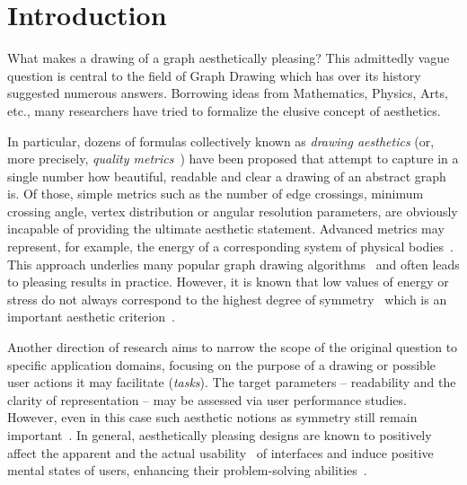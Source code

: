 
%

\section{Introduction}
\label{sec:intro}

What makes a drawing of a graph aesthetically pleasing? This admittedly vague question is central to the field of Graph
Drawing which has over its history suggested numerous answers.  Borrowing ideas from Mathematics, Physics, Arts, etc.,
many researchers have tried to formalize the elusive concept of aesthetics.

In particular, dozens of formulas collectively known as \emph{drawing aesthetics} (or, more precisely, \emph{quality
  metrics}~\cite{EadesH0K17}) have been proposed that attempt to capture in a single number how beautiful, readable and
clear a drawing of an abstract graph is.  Of those, simple metrics such as the number of edge crossings, minimum
crossing angle, vertex distribution or angular resolution parameters, are obviously incapable  of
providing the ultimate aesthetic statement.  Advanced metrics may represent, for example, the energy of a corresponding
system of physical bodies~\cite{eades84,FruchtermanR91}.  This approach underlies many popular graph drawing
algorithms~\cite{Tamassia2013} and often leads to pleasing results in practice.  However, it is known that low values of
energy or stress do not always correspond to the highest degree of symmetry~\cite{Welch2017} which is an important
aesthetic criterion~\cite{PurchaseCM96}.

Another direction of research aims to narrow the scope of the original question to specific application domains,
focusing on the purpose of a drawing or possible user actions it may facilitate (\emph{tasks}).  The target parameters
-- readability and the clarity of representation -- may be assessed via user performance studies.  However, even in this
case such aesthetic notions as symmetry still remain important~\cite{PurchaseCM96}.  In general, aesthetically pleasing
designs are known to positively affect the apparent and the actual usability~\cite{Norman02,TractinskyKI00} of
interfaces and induce positive mental states of users, enhancing their problem-solving abilities~\cite{Fredrickson98}.

